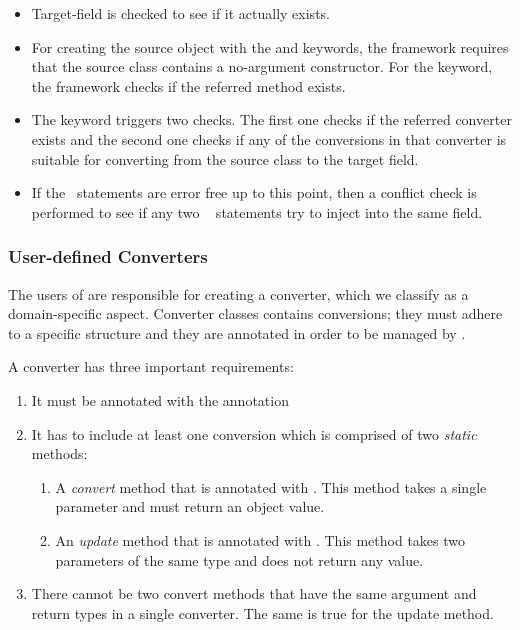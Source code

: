 \begin{itemize}
\item Target-field is checked to see if it actually exists.
\item For creating the source object with the  and  keywords, the framework requires that the source class contains a no-argument constructor. For the  keyword, the framework checks if the referred method exists.
\item The  keyword triggers two checks. The first one checks if the referred converter exists and the second one checks if any of the conversions in that converter is suitable for converting from the source class to the target field. 
\item If the \gluer~statements are error free up to this point, then a conflict check is performed to see if any two \gluer~ statements try to inject into the same field. 
\end{itemize}



\subsubsection{User-defined Converters}
\label{sec:adapter:converter}
The users of \zamk are responsible for creating a converter, which we classify as a domain-specific aspect.
Converter classes contains conversions; they must adhere to a specific structure and they are annotated in order to be managed by \zamk. 
 

A converter has three important requirements:
\begin{enumerate}
\item It must be annotated with the  annotation
\item It has to include at least one conversion which is comprised of two \emph{static} methods:
	\begin{enumerate}
	\item A \emph{convert} method that is annotated with . This method takes a single parameter and must return an object value.
	\item An \emph{update} method that is annotated with . This method takes two parameters of the same type and does not return any value.
	\end{enumerate}
\item There cannot be two convert methods that have the same argument and return types in a single converter. The same is true for the update method.  
\end{enumerate}

